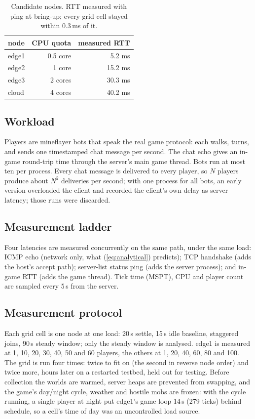 \documentclass[conference]{IEEEtran}
\begin{document}
\begin{table}[t]
\centering
\caption{Candidate nodes. RTT measured with ping at bring-up; every grid cell stayed within 0.3\,ms of it.}
\label{tab:nodes}
\begin{tabular}{lrr}
\toprule
node & CPU quota & measured RTT \\
\midrule
edge1 & 0.5 core & 5.2 ms \\
edge2 & 1 core   & 15.2 ms \\
edge3 & 2 cores  & 30.3 ms \\
cloud & 4 cores  & 40.2 ms \\
\bottomrule
\end{tabular}
\end{table}

\subsection{Workload}
Players are mineflayer bots that speak the real game protocol: each walks,
turns, and sends one timestamped chat message per second. The chat echo gives
an in-game round-trip time through the server's main game thread. Bots run at
most ten per process. Every chat message is delivered to every player, so
$N$ players produce about $N^2$ deliveries per second; with one process for
all bots, an early version overloaded the client and recorded the client's
own delay as server latency; those runs were discarded.

\subsection{Measurement ladder}
Four latencies are measured concurrently on the same path, under the same
load: ICMP echo (network only, what (\ref{eq:analytical}) predicts); TCP
handshake (adds the host's accept path); server-list status ping (adds the
server process); and in-game RTT (adds the game thread). Tick time (MSPT),
CPU and player count are sampled every 5\,s from the server.

\subsection{Measurement protocol}
Each grid cell is one node at one load: 20\,s settle, 15\,s idle baseline,
staggered joins, 90\,s steady window; only the steady window is analysed.
edge1 is measured at 1, 10, 20, 30, 40, 50 and 60 players, the others at 1,
20, 40, 60, 80 and 100. The grid is run four times: twice to fit on (the
second in reverse node order) and twice more, hours later on a restarted
testbed, held out for testing. Before collection the worlds are
warmed, server heaps are prevented from swapping, and the game's day/night
cycle, weather and hostile mobs are frozen: with the cycle running, a single
player at night put edge1's game loop 14\,s (279 ticks) behind schedule, so a cell's time of day was an
uncontrolled load source.
\end{document}
